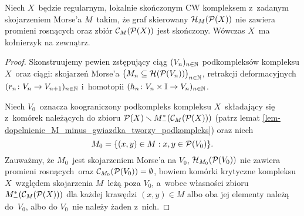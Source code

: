 \begin{stw}\label{stw-dyskretna-teoria-morsea-oswojone-na-zewnatrz}
Niech $X$~będzie regularnym, lokalnie skończonym CW kompleksem z~zadanym skojarzeniem Morse'a $M$~takim, że graf skierowany $\mathcal{H}_M(\mathcal{P}(X))$ nie zawiera promieni rosnących oraz zbiór $\mathcal{C}_M(\mathcal{P}(X))$ jest skończony. Wówczas $X$~ma kołnierzyk na zewnątrz.
\end{stw}
\begin{proof}
Skonstruujemy pewien zstępujący ciąg $(V_n)_{n\in\mathbb{N}}$ podkompleksów kompleksu $X$~oraz ciągi: skojarzeń Morse'a $\bigl(M_n\subseteq \mathcal{H}(\mathcal{P}(V_n))\bigr)_{n\in\mathbb{N}}$, retrakcji deformacyjnych $(r_n\colon V_n\to V_{n+1})_{n\in\mathbb{N}}$ i~homotopii $(h_{n}\colon V_{n}\times \mathbb{I}\to V_{n})_{n\in\mathbb{N}}$.

Niech $V_0$~oznacza koograniczony podkompleks kompleksu $X$~składający się z~komórek należących do zbioru $\mathcal{P}(X)\smallsetminus M_-^*(\mathcal{C}_M(\mathcal{P}(X)))$ (patrz lemat \ref{lem-dopelnienie_M_minus_gwiazdka_tworzy_podkompleks}) oraz niech \[M_0=\{(x,y)\in M:x,y\in\mathcal{P}(V_0)\}.\] Zauważmy, że $M_0$~jest skojarzeniem Morse'a na $V_0$, $\mathcal{H}_{M_0}(\mathcal{P}(V_0))$ nie zawiera promieni rosnących~oraz $\mathcal{C}_{M_0}(\mathcal{P}(V_0))=\emptyset$, bowiem komórki krytyczne kompleksu $X$~względem skojarzenia $M$~leżą poza $V_0$, a~wobec własności zbioru $M_-^*(\mathcal{C}_M(\mathcal{P}(X)))$ dla każdej krawędzi $(x,y)\in M$ albo oba jej elementy należą do~$V_0$, albo do $V_0$~nie należy żaden z~nich.


\end{proof}
